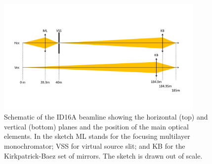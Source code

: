 \documentclass{iucr}              %
\begin{document}
\begin{figure}\label{fig:ID16A}
    \centering
    \includegraphics[width=0.9\textwidth,clip=true,trim=50 85 50 85]{GRAPHICS/ID16A.pdf}
    \caption{Schematic of the ID16A beamline showing the horizontal (top) and vertical (bottom) planes and the position of the main optical elements. In the sketch ML stands for the focusing multilayer monochromator; VSS for virtual source slit; and KB for the Kirkpatrick-Baez set of mirrors. The sketch is drawn out of scale.}
\end{figure}


\begin{table}\label{tab:Positions}
    \caption{Position of the main ID16A optical elements with respect to the source (undulator centre). It also shows the values for horizontal and vertical demagnification $M^{-1}=p/q$, where $p$ and $q$ are the the distances object-optics and optics-image, respectively.}
\end{table}

\end{document}
